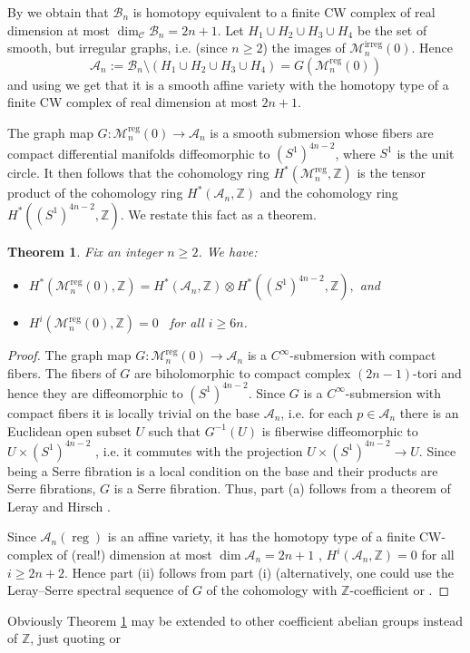 \documentclass[
  a4paper, 
  reqno, 
  oneside, 
  11pt
]{amsart}
\theoremstyle{plain}	%
\newtheorem{theorem}{Theorem} %
\theoremstyle{mydef} %
\theoremstyle{remark}
\theoremstyle{definition}
\theoremstyle{remark}
\DeclareMathOperator{\reg}{reg}
\DeclareMathOperator{\irreg}{irreg}
\begin{document}
 
 By \cite{af,hl} we obtain that $\mathcal B_n$ is homotopy equivalent to a finite CW complex of real dimension at most $\dim _{\mathcal C} \mathcal B_n =2n+1$.
Let $H_1\cup H_2\cup H_3\cup H_4$ be the set of smooth, but irregular graphs, i.e. (since $n\ge 2$) the images of $\mathcal M_n^{\irreg}(0)$. Hence 
$$\mathcal A_n:= \mathcal B_n\setminus (H_1\cup H_2\cup H_3\cup H_4) =G(\mathcal M_n^{\reg}(0))$$ and using 
\cite{af,hl} we get that it 
is a smooth affine variety with the homotopy type of a finite CW complex of real dimension at most $2n+1$.

The graph map $G\colon \mathcal M_n^{\reg}(0)\to \mathcal A_n$ is a smooth submersion whose fibers are compact differential manifolds diffeomorphic to $(S^1)^{4n-2}$, where $S^1$ is the unit circle.
It then follows that the cohomology ring $H^*(\mathcal M_n^{\reg},\mathbb Z)$ is the tensor product of the cohomology ring $H^*(\mathcal A_n,\mathbb Z)$ and the cohomology ring $H^*((S^1)^{4n-2},\mathbb Z)$. We restate this fact as a theorem.

\begin{theorem}\label{full1bis}
Fix an integer $n\ge 2$. We have:
\begin{itemize}
\item[(i)]  \quad $H^*(\mathcal M_n^{\reg}(0),\mathbb Z)= H^*(\mathcal A_n,\mathbb Z)\otimes H^*((S^1)^{4n-2},\mathbb Z),$
and 
\item[(ii)] \quad  $H^i(\mathcal M_n^{\reg}(0),\mathbb Z)=0$ \ for all $i\ge 6n$.
\end{itemize}
\end{theorem}

\begin{proof}
The graph map $G\colon \mathcal M_n^{\reg}(0)\to \mathcal A_n$ is a $C^\infty$-submersion with compact fibers. The fibers of $G$ are biholomorphic to compact complex $(2n-1)$-tori and hence they are diffeomorphic to $(S^1)^{4n-2}$.
 Since $G$ is a $C^\infty$-submersion with compact fibers it is locally trivial on the base $\mathcal A_n$, i.e. for each $p\in \mathcal A_n$ there is an Euclidean open subset $U$ such that $G^{-1}(U)$ is fiberwise diffeomorphic to $U\times (S^1)^{4n-2}$ , i.e. it commutes with the projection $U\times (S^1)^{4n-2}\to U$. Since being a Serre fibration is a local condition on the base and their products are Serre fibrations,
$G$ is a Serre fibration. Thus, part (a) follows from a theorem of Leray and Hirsch \cite[17.8.1]{tdie}. 

Since $\mathcal A_n(\reg)$ is an affine variety, it has the homotopy type of a finite CW-complex of (real!) 
dimension at most $\dim  \mathcal A_n = 2n+1$ \cite{af,hl}, $H^i(\mathcal A_n,\mathbb Z)=0$ for all  $i\ge 2n+2$. Hence part (ii) follows from part (i) (alternatively, one could use the Leray--Serre spectral sequence of $G$ of the cohomology with $\mathbb Z$-coefficient \cite[Cor..4]{dimca} or  \cite[Thm.\thinspace I.5.2]{McCleary}.
\end{proof}
Obviously Theorem \ref{full1bis} may be extended to other coefficient abelian groups instead of $\mathbb Z$, just quoting \cite{dimca} or \cite{McCleary}
\end{document}
